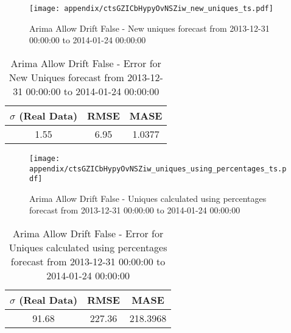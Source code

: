 \begin{figure}[H] \begin{center} \leavevmode
\texttt{[image: appendix/ctsGZICbHypyOvNSZiw\_new\_uniques\_ts.pdf]} \caption{
Arima Allow Drift False - New uniques forecast from 2013-12-31 00:00:00 to 2014-01-24 00:00:00} \label{fig:appendix/ctsGZICbHypyOvNSZiw_new_uniques_ts.pdf} \end{center}
\end{figure}

\begin{table}[H]
\centering
\footnotesize
\begin{tabular}{ccc}
$\sigma$ (Real Data) & RMSE & MASE   \\ \hline
1.55 & 6.95 & 1.0377 \\
\end{tabular}

\vspace{0.5cm}

\caption{
Arima Allow Drift False - Error for New Uniques forecast from 2013-12-31 00:00:00 to 2014-01-24 00:00:00}
\end{table}

\begin{figure}[H] \begin{center} \leavevmode
\texttt{[image: appendix/ctsGZICbHypyOvNSZiw\_uniques\_using\_percentages\_ts.pdf]} \caption{
Arima Allow Drift False - Uniques calculated using percentages forecast from 2013-12-31 00:00:00 to 2014-01-24 00:00:00} \label{fig:appendix/ctsGZICbHypyOvNSZiw_uniques_using_percentages_ts.pdf} \end{center}
\end{figure}

\begin{table}[H]
\centering
\footnotesize
\begin{tabular}{ccc}
$\sigma$ (Real Data) & RMSE & MASE   \\ \hline
91.68 & 227.36 & 218.3968 \\
\end{tabular}

\vspace{0.5cm}

\caption{
Arima Allow Drift False - Error for Uniques calculated using percentages forecast from 2013-12-31 00:00:00 to 2014-01-24 00:00:00}
\end{table}



